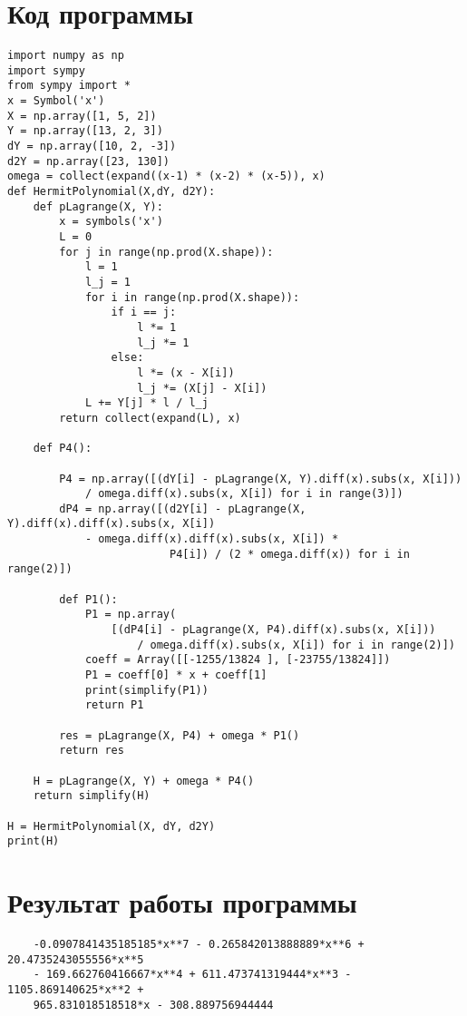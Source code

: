 \documentclass[12pt,a4paper]{article}
\begin{document}
\section{Код программы}
\begin{verbatim}
import numpy as np
import sympy
from sympy import *
x = Symbol('x')
X = np.array([1, 5, 2])
Y = np.array([13, 2, 3])
dY = np.array([10, 2, -3])
d2Y = np.array([23, 130])
omega = collect(expand((x-1) * (x-2) * (x-5)), x)
def HermitPolynomial(X,dY, d2Y):
    def pLagrange(X, Y):
        x = symbols('x')
        L = 0
        for j in range(np.prod(X.shape)):
            l = 1
            l_j = 1
            for i in range(np.prod(X.shape)):
                if i == j:
                    l *= 1
                    l_j *= 1
                else:
                    l *= (x - X[i])
                    l_j *= (X[j] - X[i])
            L += Y[j] * l / l_j
        return collect(expand(L), x)

    def P4():

        P4 = np.array([(dY[i] - pLagrange(X, Y).diff(x).subs(x, X[i])) 
            / omega.diff(x).subs(x, X[i]) for i in range(3)])
        dP4 = np.array([(d2Y[i] - pLagrange(X, Y).diff(x).diff(x).subs(x, X[i]) 
            - omega.diff(x).diff(x).subs(x, X[i]) *
                         P4[i]) / (2 * omega.diff(x)) for i in range(2)])

        def P1():
            P1 = np.array(
                [(dP4[i] - pLagrange(X, P4).diff(x).subs(x, X[i])) 
                    / omega.diff(x).subs(x, X[i]) for i in range(2)])
            coeff = Array([[-1255/13824 ], [-23755/13824]])
            P1 = coeff[0] * x + coeff[1]
            print(simplify(P1))
            return P1

        res = pLagrange(X, P4) + omega * P1()
        return res

    H = pLagrange(X, Y) + omega * P4()
    return simplify(H)

H = HermitPolynomial(X, dY, d2Y)
print(H)
\end{verbatim}
\section{Результат работы программы}
\begin{verbatim}
    -0.0907841435185185*x**7 - 0.265842013888889*x**6 + 20.4735243055556*x**5 
    - 169.662760416667*x**4 + 611.473741319444*x**3 - 1105.869140625*x**2 + 
    965.831018518518*x - 308.889756944444
\end{verbatim}
\end{document}
